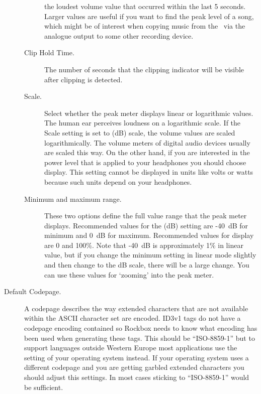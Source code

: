 \begin{description}
\begin{description}
      the loudest volume value that occurred within the last 5 seconds.
      Larger values are useful if you want to find the peak level of a song,
      which might be of interest when copying music from the \dap\ via the
      analogue output to some other recording device.
    \item[Clip Hold Time.]
      The number of seconds that the clipping indicator will be visible
      after clipping is detected.
    \item[\label{ref:Peakmetersetting}Scale.]
      Select whether the peak meter displays linear or logarithmic values.
      The human ear perceives loudness on a logarithmic scale. If the Scale
      setting is set to  (dB) scale, the volume values
      are scaled logarithmically. The volume meters of digital audio
      devices usually are scaled this way. On the other hand, if you
      are interested in the power level that is applied to your headphones
      you should choose  display. This setting cannot be
      displayed in units like volts or watts because such units depend
      on your headphones.
    \item[Minimum and maximum range.]
      These two options define the full value range that the peak meter
      displays. Recommended values for the  (dB) setting
      are {}-40~dB for minimum and 0~dB for maximum. Recommended values
      for  display are 0 and 100\%. Note that {}-40~dB is
      approximately 1\% in linear value, but if you change the minimum
      setting in linear mode slightly and then change to the dB scale,
      there will be a large change. You can use these values for `zooming'
      into the peak meter.
    \end{description}

    \item[\label{ref:Defaultcodepage}Default Codepage.]
      A codepage describes the way extended characters that are not available
      within the ASCII character set are encoded. ID3v1 tags do not have a
      codepage encoding contained so Rockbox needs to know what encoding has
      been used when generating these tags. This should be ``ISO-8859-1'' but
      to support languages outside Western Europe most applications use
      the setting of your operating system instead. If your operating system
      uses a different codepage and you are getting garbled extended characters
      you should adjust this settings. In most cases sticking to
      ``ISO-8859-1'' would be sufficient.
  \end{description}
